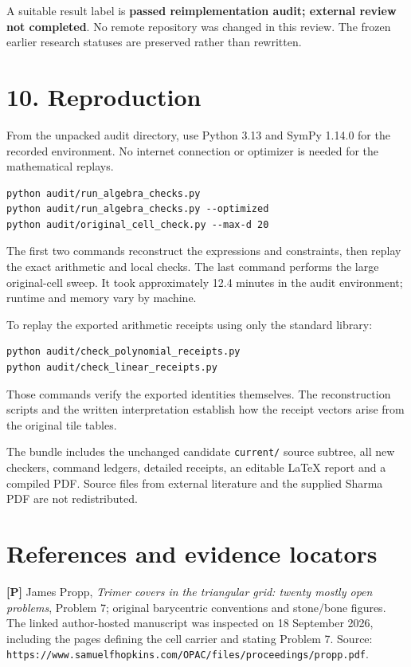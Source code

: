 \documentclass[
  11pt,
]{article}
\begin{document}
A suitable result label is \textbf{passed reimplementation audit;
external review not completed}. No remote repository was changed in this
review. The frozen earlier research statuses are preserved rather than
rewritten.

\section{10. Reproduction}\label{reproduction}

From the unpacked audit directory, use Python 3.13 and SymPy 1.14.0 for
the recorded environment. No internet connection or optimizer is needed
for the mathematical replays.

\begin{verbatim}
python audit/run_algebra_checks.py
python audit/run_algebra_checks.py --optimized
python audit/original_cell_check.py --max-d 20
\end{verbatim}

The first two commands reconstruct the expressions and constraints, then
replay the exact arithmetic and local checks. The last command performs
the large original-cell sweep. It took approximately 12.4 minutes in the
audit environment; runtime and memory vary by machine.

To replay the exported arithmetic receipts using only the standard
library:

\begin{verbatim}
python audit/check_polynomial_receipts.py
python audit/check_linear_receipts.py
\end{verbatim}

Those commands verify the exported identities themselves. The
reconstruction scripts and the written interpretation establish how the
receipt vectors arise from the original tile tables.

The bundle includes the unchanged candidate \texttt{current/} source
subtree, all new checkers, command ledgers, detailed receipts, an
editable LaTeX report and a compiled PDF. Source files from external
literature and the supplied Sharma PDF are not redistributed.

\section{References and evidence
locators}\label{references-and-evidence-locators}

\textbf{{[}P{]}} James Propp, \emph{Trimer covers in the triangular
grid: twenty mostly open problems}, Problem 7; original barycentric
conventions and stone/bone figures. The linked author-hosted manuscript
was inspected on 18 September 2026, including the pages defining the
cell carrier and stating Problem 7. Source:
\texttt{https://www.samuelfhopkins.com/OPAC/files/proceedings/propp.pdf}.
\end{document}
